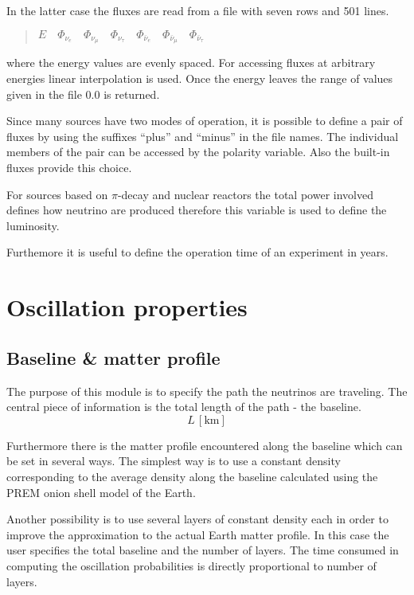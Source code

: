 In the latter case the fluxes are read from a file with seven rows and
501 lines.
\begin{quotation}
$ E\quad
\Phi_{\nu_e}\quad
\Phi_{\nu_\mu}\quad
\Phi_{\nu_\tau}\quad
\Phi_{\bar\nu_e}\quad
\Phi_{\bar\nu_\mu}\quad
\Phi_{\bar\nu_\tau}$
\end{quotation}
where the energy values are evenly spaced. 
For accessing fluxes at 
arbitrary energies linear interpolation is used. Once the energy leaves the
range of values given in the file $0.0$ is returned.

Since many sources have two modes of operation, it is possible to define
a pair of fluxes by using the suffixes ``plus'' and ``minus'' in the file 
names. The individual members of the pair can be accessed by the polarity
variable. Also the built-in fluxes provide this choice.


For sources based on $\pi$-decay and nuclear reactors the total power
involved defines how neutrino are produced therefore this variable is
used to define the luminosity.

Furthemore it is useful to define the operation time of an experiment
in years.

\section{Oscillation properties}



\subsection{Baseline \& matter profile}
The purpose of this module is to specify the path the neutrinos
are traveling. The central piece of information is the total length
of the path - the baseline.
\begin{equation}
L\,\left[\mathrm{km}\right]
\end{equation} 

Furthermore there is
the matter profile encountered along the baseline which can be set in
several ways. The simplest way is to use a constant density corresponding
to the average density along the baseline calculated using the 
PREM\cite{Stacey} onion shell model of the 
Earth.

Another possibility is to use several layers of constant density each in 
order to improve the approximation to the actual Earth matter profile. In this
case the user specifies the total baseline and the number of layers. The
time consumed in computing the oscillation probabilities is directly 
proportional to number of layers.

